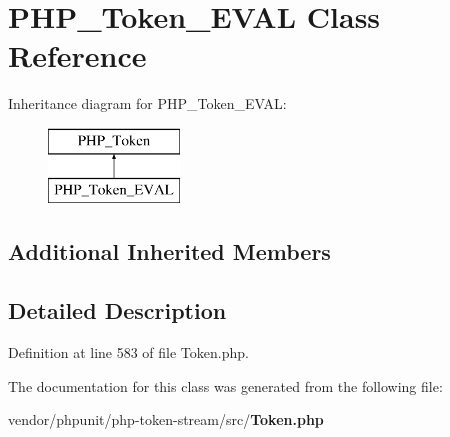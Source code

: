 \section{P\+H\+P\+\_\+\+Token\+\_\+\+E\+V\+A\+L Class Reference}
\label{class_p_h_p___token___e_v_a_l}
Inheritance diagram for P\+H\+P\+\_\+\+Token\+\_\+\+E\+V\+A\+L\+:\begin{figure}[H]
\begin{center}
\leavevmode
\includegraphics[height=2.000000cm]{class_p_h_p___token___e_v_a_l}
\end{center}
\end{figure}
\subsection*{Additional Inherited Members}


\subsection{Detailed Description}


Definition at line 583 of file Token.\+php.



The documentation for this class was generated from the following file\+:\begin{DoxyCompactItemize}
\item 
vendor/phpunit/php-\/token-\/stream/src/{\bf Token.\+php}\end{DoxyCompactItemize}
